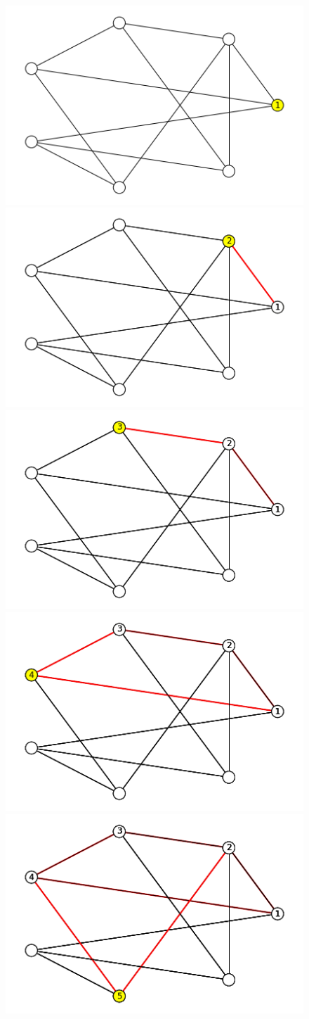 \documentclass{report}
\begin{document}
\begin{CJK}{UTF8}{min}
    \begin{figure}
        \includegraphics[width=.49\textwidth]{data/ex-8-NA-1.png}\hfill
        \includegraphics[width=.49\textwidth]{data/ex-8-NA-2.png}
        \\[\smallskipamount]
        \includegraphics[width=.49\textwidth]{data/ex-8-NA-3.png}\hfill
        \includegraphics[width=.49\textwidth]{data/ex-8-NA-4.png}
        \\[\smallskipamount]
        \includegraphics[width=.49\textwidth]{data/ex-8-NA-5.png}\hfill

\end{figure}
\end{CJK}
\end{document}
